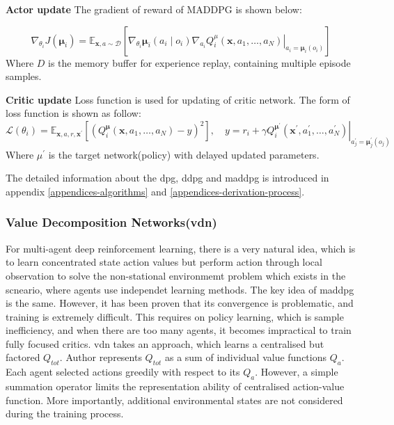 \textbf{Actor update} The gradient of reward of MADDPG is shown below:

\begin{equation}
\nabla_{\theta_{i}} J\left(\boldsymbol{\mu}_{i}\right)=\mathbb{E}_{\mathbf{x}, a \sim \mathcal{D}}\left[\left.\nabla_{\theta_{i}} \boldsymbol{\mu}_{i}\left(a_{i} \mid o_{i}\right) \nabla_{a_{i}} Q_{i}^{\mu}\left(\mathbf{x}, a_{1}, \ldots, a_{N}\right)\right|_{a_{i}=\boldsymbol{\mu}_{i}\left(o_{i}\right)}\right]
\end{equation}
Where $D$ is the memory buffer for experience replay, containing multiple episode samples.

\textbf{Critic update} Loss function is used for updating of critic network. The form of loss function is shown as follow:
\begin{equation}
\mathcal{L}\left(\theta_{i}\right)=\mathbb{E}_{\mathbf{x}, a, r, \mathbf{x}^{\prime}}\left[\left(Q_{i}^{\boldsymbol{\mu}}\left(\mathbf{x}, a_{1}, \ldots, a_{N}\right)-y\right)^{2}\right], \quad y=r_{i}+\left.\gamma Q_{i}^{\boldsymbol{\mu}^{\prime}}\left(\mathbf{x}^{\prime}, a_{1}^{\prime}, \ldots, a_{N}^{\prime}\right)\right|_{a_{j}^{\prime}=\boldsymbol{\mu}_{j}^{\prime}\left(o_{j}\right)}
\end{equation}
Where $\mu^{\prime}$ is the target network(policy) with delayed updated parameters.

The detailed information about the \gls{dpg}, \gls{ddpg} and \gls{maddpg} is introduced in appendix \ref{appendices-algorithms} and \ref{appendices-derivation-process}.

\subsubsection{Value Decomposition Networks(\gls{vdn})}
For multi-agent deep reinforcement learning, there is a very natural idea, which is to learn concentrated state action values but perform action through local observation to solve the non-stational environmemt problem which exists in the scneario, where agents use independet learning methods. The key idea of \gls{maddpg} is the same. However, it has been proven that its convergence is problematic, and training is extremely difficult. This requires on policy learning, which is sample inefficiency, and when there are too many agents, it becomes impractical to train fully focused critics. \gls{vdn}\parencite{Sunehag2017} takes an approach, which learns a centralised but factored $Q_{tot}$. Author represents $Q_{tot}$ as a sum of individual value functions $Q_a$. Each agent selected actions greedily with respect to its $Q_a$. However, a simple summation operator limits the representation ability of centralised action-value function. More importantly, additional environmental states are not considered during the training process.

